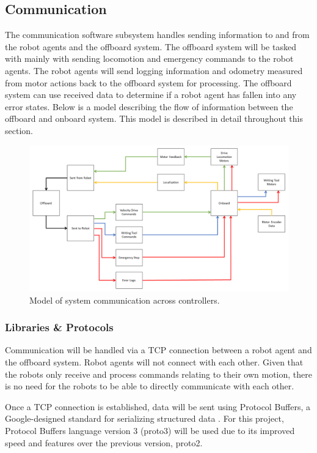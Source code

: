 
\subsection{Communication}
\label{sec:software_comm}

The communication software subsystem handles sending information to and from the robot agents and the offboard system. The offboard system will be tasked with mainly with sending locomotion and emergency commands to the robot agents. The robot agents will send logging information and odometry measured from motor actions back to the offboard system for processing. The offboard system can use received data to determine if a robot agent has fallen into any error states. Below is a model describing the flow of information between the offboard and onboard system. This model is described in detail throughout this section.

\begin{figure}
\centering
\includegraphics[width=0.9\columnwidth]{figs/sw_arch_communication.png}
\caption{Model of system communication across controllers.}
\label{fig:software_comm_model}
\end{figure}

\subsubsection{Libraries \& Protocols}
\label{sec:software_comm_libs}
Communication will be handled via a TCP connection between a robot agent and the offboard system. Robot agents will not connect with each other. Given that the robots only receive and process commands relating to their own motion, there is no need for the robots to be able to directly communicate with each other.

Once a TCP connection is established, data will be sent using Protocol Buffers, a Google-designed standard for serializing structured data \cite{protobuf3}. For this project, Protocol Buffers language version 3 (proto3) will be used due to its improved speed and features over the previous version, proto2.

